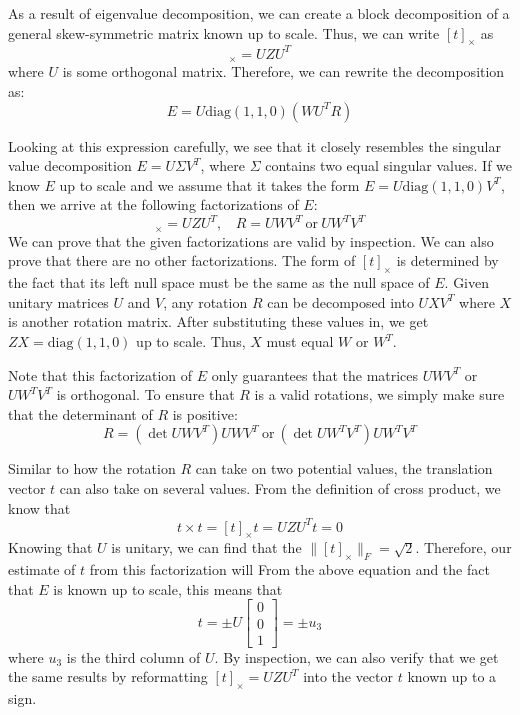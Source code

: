 \documentclass[a4paper, 12pt]{article}
\numberwithin{equation}{section}
\begin{document}
As a result of eigenvalue decomposition, we can create a block decomposition of a general skew-symmetric matrix known up to scale. Thus, we can write $[t]_\times$ as 
\begin{equation}
    [t]_\times  = UZU^T
\end{equation}
where $U$ is some orthogonal matrix. Therefore, we can rewrite the decomposition as:
\begin{equation}
    E = U\mathrm{diag}(1,1,0)  (WU^TR)
\end{equation}

Looking at this expression carefully, we see that it closely resembles the singular value decomposition $E = U\Sigma V^T$, where $\Sigma$ contains two equal singular values. If we know $E$ up to scale and we assume that it takes the form $E = U \mathrm{diag}(1,1,0)V^T$, then we arrive at the following factorizations of $E$:
\begin{equation}
    [t]_\times  = UZU^T, ~~~~ R= UWV^T ~ \mathrm{or} ~ UW^TV^T
\end{equation}
We can prove that the given factorizations are valid by inspection. We can also prove that there are no other factorizations. The form of $[t]_\times$ is determined by the fact that its left null space must be the same as the null space of $E$. Given unitary matrices $U$ and $V$, any rotation $R$ can be decomposed into $UXV^T$ where $X$ is another rotation matrix. After substituting these values in, we get $ZX = \mathrm{diag}(1,1,0)$ up to scale. Thus, $X$ must equal $W$ or $W^T$. 

Note that this factorization of $E$ only guarantees that the matrices $UWV^T$ or $UW^TV^T$ is orthogonal. To ensure that $R$ is a valid rotations, we simply make sure that the determinant of $R$ is positive:
\begin{equation}
    R= (\det UWV^T)UWV^T ~ \mathrm{or} ~ (\det UW^TV^T)UW^TV^T
\end{equation}

Similar to how the rotation $R$ can take on two potential values, the translation vector $t$ can also take on several values. From the definition of cross product, we know that
\begin{equation}
    t \times t = [t]_\times t = UZU^T t = 0
\end{equation}
Knowing that $U$ is unitary, we can find that the $\|[t]_\times\|_F = \sqrt{2}$. Therefore, our estimate of $t$ from this factorization will From the above equation and the fact that $E$ is known up to scale, this means that 
\begin{equation}
    t = \pm U\begin{bmatrix}0\\0\\1\end{bmatrix} = \pm u_3
\end{equation}
where $u_3$ is the third column of $U$. By inspection, we can also verify that we get the same results by reformatting $[t]_\times = UZU^T$ into the vector $t$ known up to a sign.
\end{document}
